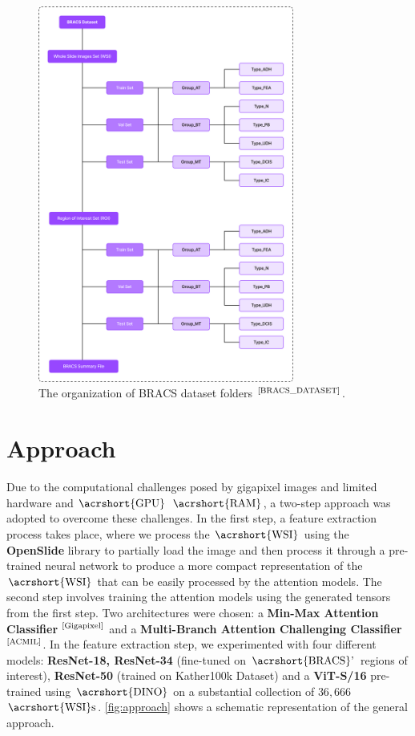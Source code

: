 \documentclass[
11pt, %
english, %
singlespacing, %
headsepline, %
]{project_structure}
\begin{document}
\begin{figure}[H]
    \centering
    \includegraphics[width=0.75\textwidth]{figures/dataset/data_org.png}
    \caption{The organization of \acrshort{BRACS} dataset folders $^{\text{\cite{BRACS_DATASET}}}$.}
    \label{fig:data_organization}
\end{figure}

\newpage
\section{Approach}

\noindent Due to the computational challenges posed by gigapixel images and limited hardware and $\text{\acrshort{GPU}}$ $\text{\acrshort{RAM}}$, a two-step approach was adopted to overcome these challenges. In the first step, a feature extraction process takes place, where we process the $\text{\acrshort{WSI}}$ using the \textbf{OpenSlide} library to partially load the image and then process it through a pre-trained neural network to produce a more compact representation of the $\text{\acrshort{WSI}}$ that can be easily processed by the attention models. The second step involves training the attention models using the generated tensors from the first step. Two architectures were chosen: a \textbf{Min-Max Attention Classifier} $^\text{\cite{Gigapixel}}$ and a \textbf{Multi-Branch Attention Challenging Classifier}$^\text{\cite{ACMIL}}$. In the feature extraction step, we experimented with four different models: \textbf{\acrshort{ResNet}-18, \acrshort{ResNet}-34} (fine-tuned on $\text{\acrshort{BRACS}'}$ regions of interest), \textbf{\acrshort{ResNet}-50} (trained on Kather100k Dataset) and a \textbf{ViT-S/16} pre-trained using $\text{\acrshort{DINO}}$ on a substantial collection of $36,666$ $\text{\acrshort{WSI}s}$. \autoref{fig:approach} shows a schematic representation of the general approach.\\
\end{document}
